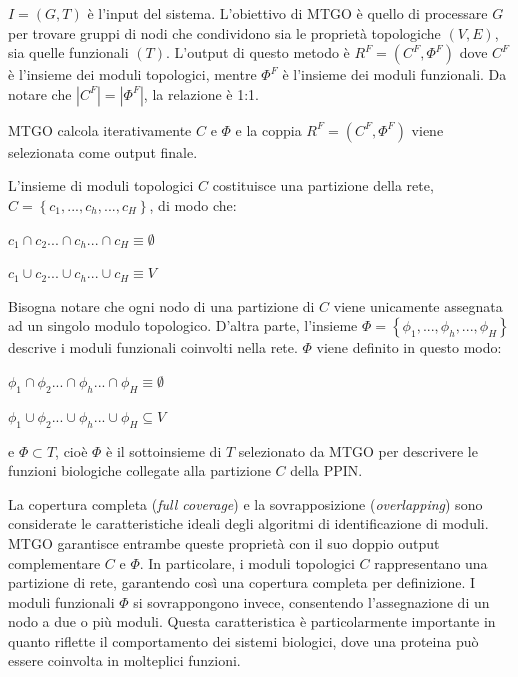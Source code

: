 \documentclass[11pt]{article}
\begin{document}
$I = (G,T)$ è l'input del sistema. L'obiettivo di MTGO è quello di processare $G$ per trovare gruppi di nodi che condividono sia le proprietà topologiche $(V,E)$, sia quelle funzionali $(T)$. L'output di questo metodo è $R^F = (C^F, \Phi^F)$ dove $C^F$ è l'insieme dei moduli topologici, mentre $\Phi^F$ è l'insieme dei moduli funzionali. Da notare che $|C^F| = |\Phi^F|$, la relazione è 1:1. 

MTGO calcola iterativamente $C$ e $\Phi$ e la coppia $R^F = (C^F, \Phi^F)$ viene selezionata come output finale.

L'insieme di moduli topologici $C$ costituisce una partizione della rete, $C = \left \{c_1, ..., c_h, ..., c_H\right \}$, di modo che:

\begin{center}
$c_1 \cap c_2 ... \cap c_h ... \cap c_H \equiv \emptyset$
\end{center}
\begin{center}
 $c_1 \cup c_2 ... \cup c_h ... \cup c_H \equiv V$
\end{center}

Bisogna notare che ogni nodo di una partizione di $C$ viene unicamente assegnata ad un singolo modulo topologico. D'altra parte, l'insieme $\Phi = \left \{\phi_1, ..., \phi_h, ..., \phi_H\right \}$ descrive i moduli funzionali coinvolti nella rete. $\Phi$ viene definito in questo modo:

\begin{center}
$\phi_1 \cap \phi_2 ... \cap \phi_h ... \cap \phi_H \equiv \emptyset$
\end{center}
\begin{center}
 $\phi_1 \cup \phi_2 ... \cup \phi_h ... \cup \phi_H \subseteq V$
\end{center}

e $\Phi \subset T$, cioè $\Phi$ è il sottoinsieme di $T$ selezionato da MTGO per descrivere le funzioni biologiche collegate alla partizione $C$ della PPIN.

La copertura completa (\textit{full coverage}) e la sovrapposizione (\textit{overlapping}) sono considerate le caratteristiche ideali degli algoritmi di identificazione di moduli. MTGO garantisce entrambe queste proprietà con il suo doppio output complementare $C$ e $\Phi$. In particolare, i moduli topologici $C$ rappresentano una partizione di rete, garantendo così una copertura completa per definizione. I moduli funzionali $\Phi$ si sovrappongono invece, consentendo l'assegnazione di un nodo a due o più moduli. Questa caratteristica è particolarmente importante in quanto riflette il comportamento dei sistemi biologici, dove una proteina può essere coinvolta in molteplici funzioni.
\end{document}
